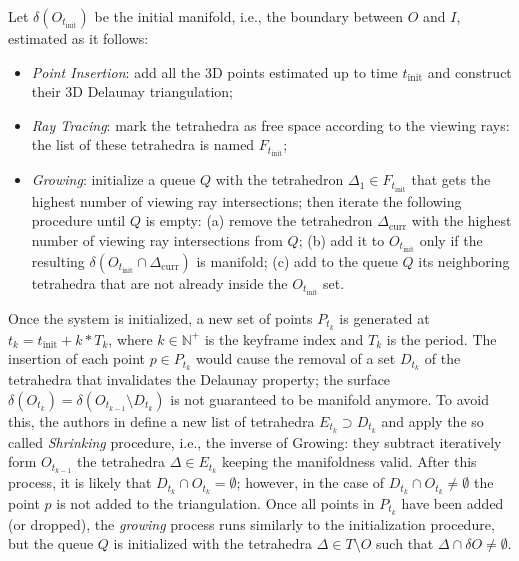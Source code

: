 Let  $\delta( O_{t_{\text{init}}})$ be the initial manifold, i.e., the boundary between $O$ and $I$, estimated as it follows:
\begin{itemize}
  \item \emph{Point Insertion}: add all the 3D points estimated up to time $t_{\text{init}}$ and construct their 3D Delaunay triangulation;
  \item \emph{Ray Tracing}: mark the tetrahedra as free space according to the viewing rays: the list of these tetrahedra is named $F_{t_{\text{init}}}$;
  \item \emph{Growing}: initialize a queue $Q$ with the tetrahedron $\Delta_1 \in F_{t_{\text{init}}}$ that gets the highest number of viewing ray intersections; then iterate the following procedure until $Q$ is empty: (a) remove the tetrahedron $\Delta_{\text{curr}}$ with the highest number of viewing ray intersections from $Q$; (b) add it to $O_{t_{\text{init}}}$ only if the resulting $\delta (O_{t_{\text{init}}} \cap \Delta_{\text{curr}})$  is manifold; (c) add to the queue $Q$ its neighboring tetrahedra that are not already inside the $O_{t_{\text{init}}}$ set. 
\end{itemize}

Once the system is initialized, a new set of points $P_{t_k}$ is generated at $t_k= t_{\text{init}} + k*T_k$, where $k \in \mathbb{N^+}$ is the keyframe index and $T_k$ is the period. 
The insertion of each point $p\in P_{t_k}$ would cause the removal of a set $D_{t_k}$ of the tetrahedra that invalidates the Delaunay property; the surface $\delta (O_{t_k}) = \delta (O_{t_{k-1}} \setminus D_{t_k})$ is not guaranteed to be manifold anymore. 
To avoid this, the authors in \cite{litvinov_lhuillier_13} define a new list of tetrahedra $E_{t_k} \supset D_{t_k}$ and apply the so called \emph{Shrinking} procedure, i.e., the inverse of Growing: they subtract iteratively form $O_{t_{k-1}}$ the tetrahedra  $\Delta \in E_{t_k}$ keeping the manifoldness valid.
After this process, it is likely that $D_{t_k} \cap O_{t_k} = \emptyset$; however, in the case of $D_{t_k} \cap O_{t_k} \neq \emptyset$ the point $p$ is not added to the triangulation.
Once all points in $P_{t_k}$ have been added (or dropped), the \emph{growing} process runs similarly to the initialization procedure, but the queue $Q$ is initialized with the tetrahedra $\Delta \in T \setminus O$ such that  $\Delta \cap \delta O \neq \emptyset$.




